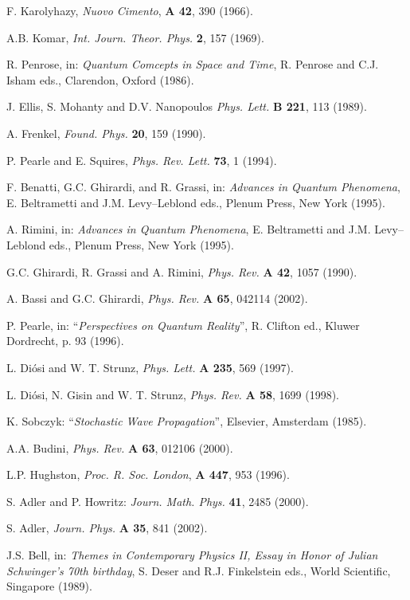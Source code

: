 \documentclass[12pt]{article}
\begin{document}
\begin{thebibliography}{999}
 F. Karolyhazy, {\it Nuovo Cimento}, {\bf A 42}, 390
(1966).

 A.B. Komar, {\it Int. Journ. Theor. Phys.} {\bf 2},
157 (1969).

 R. Penrose, in: {\it Quantum Comcepts in Space and
Time}, R. Penrose and C.J. Isham eds., Clarendon, Oxford (1986).

 J. Ellis, S. Mohanty and D.V. Nanopoulos {\it Phys.
Lett.} {\bf B 221}, 113 (1989).

 A. Frenkel, {\it Found. Phys.} {\bf 20}, 159 (1990).

 P. Pearle and E. Squires, {\it Phys. Rev. Lett.}
{\bf 73}, 1 (1994).

 F. Benatti, G.C. Ghirardi, and R. Grassi,
in: {\it Advances in Quantum Phenomena}, E. Beltrametti and J.M.
Levy--Leblond eds., Plenum Press, New York (1995).

 A. Rimini, in: {\it Advances in Quantum Phenomena},
E. Beltrametti and J.M. Levy--Leblond eds., Plenum Press, New York
(1995).

 G.C. Ghirardi, R. Grassi and A. Rimini, {\it Phys.
Rev.} {\bf A 42}, 1057 (1990).

 A. Bassi and G.C. Ghirardi, {\it Phys. Rev.} {\bf
A 65}, 042114 (2002).

 P. Pearle, in: ``{\it Perspectives on Quantum
Reality}'', R. Clifton ed., Kluwer Dordrecht, p. 93 (1996).

 L. Di\'osi and W. T. Strunz, {\it Phys.
Lett.} {\bf A 235}, 569 (1997).

 L. Di\'osi, N. Gisin and W. T. Strunz, {\it Phys.
Rev.} {\bf A 58}, 1699 (1998).

 K. Sobczyk: ``{\it Stochastic Wave Propagation}'',
Elsevier, Amsterdam (1985).

 A.A. Budini, {\it Phys. Rev.} {\bf A 63}, 012106
(2000).

 L.P. Hughston, {\it Proc. R. Soc. London}, {\bf A
447}, 953 (1996).

 S. Adler and P. Howritz: {\it Journ. Math. Phys.}
{\bf 41}, 2485 (2000).

 S. Adler, {\it Journ. Phys.} {\bf A 35}, 841 (2002).

 J.S. Bell, in: {\it Themes in Contemporary
Physics II, Essay in Honor of Julian Schwinger's 70th birthday},
S. Deser and R.J. Finkelstein eds., World Scientific, Singapore
(1989).


\end{thebibliography}
\end{document}
